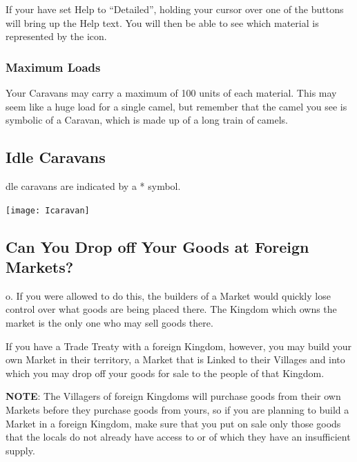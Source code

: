 
If your have set Help to “Detailed”, holding your cursor over one of the buttons will bring up the Help text. You will then be able to see which material is represented by the icon.

\subsubsection{\textsf{Maximum Loads}}

Your Caravans may carry a maximum of 100 units of each material. This may seem like a huge load for a single camel, but remember that the camel you see is symbolic of a Caravan, which is made up of a long train of camels.

\subsection{\textsf{Idle Caravans}}


dle caravans are indicated by a * symbol.

\begin{center}
	\texttt{[image: Icaravan]}
\end{center}

\subsection{\textsf{Can You Drop off Your Goods at Foreign Markets?}}


o. If you were allowed to do this, the builders of a Market would quickly lose control over what goods are being placed there. The Kingdom which owns the market is the only one who may sell goods there.

If you have a Trade Treaty with a foreign Kingdom, however, you may build your own Market in their territory, a Market that is Linked to their Villages and into which you may drop off your goods for sale to the people of that Kingdom.

\textbf{NOTE}: The Villagers of foreign Kingdoms will purchase goods from their own Markets before they purchase goods from yours, so if you are planning to build a Market in a foreign Kingdom, make sure that you put on sale only those goods that the locals do not already have access to or of which they have an insufficient supply.

